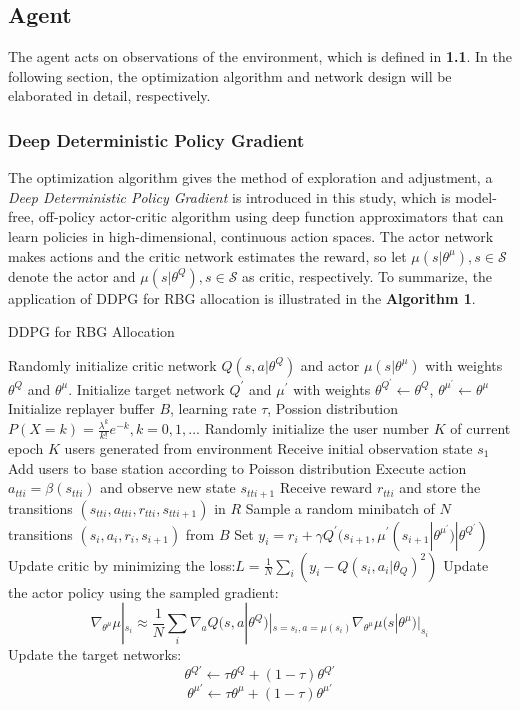 \documentclass{article}
\begin{document}
\subsection{Agent}
The agent acts on observations of the environment, which is defined in \textbf{1.1}.
In the following section, the optimization algorithm and network design will be elaborated in detail, respectively.
\subsubsection{Deep Deterministic Policy Gradient}
The optimization algorithm gives the method of exploration and adjustment, a \textit{Deep Deterministic Policy Gradient} is introduced in this study,
which is model-free, off-policy actor-critic algorithm using deep function approximators that can learn policies in high-dimensional, continuous action spaces.
\cite{Lillicrap2015Continuous}
The actor network makes actions and the critic network estimates the reward,
so let $ \mu (s|\theta^{\mu}), s\in \mathcal{S} $ denote the actor and $ \mu (s|\theta^{Q}), s\in \mathcal{S} $ as critic, respectively.
To summarize, the application of DDPG for RBG allocation is illustrated in the \textbf{Algorithm 1}.

\begin{algorithm}
\caption{DDPG for RBG Allocation}
\begin{algorithmic}

\State Randomly initialize critic network $ Q(s, a|\theta^Q) $ and actor $ \mu (s|\theta^{\mu}) $ with weights $ \theta^Q $ and $ \theta^{\mu} $.
\State Initialize target network $ Q^\prime $ and $ \mu^\prime $ with weights $ \theta^{Q^\prime} \leftarrow \theta^Q $, $ \theta^{\mu^\prime} \leftarrow \theta^{\mu}$ 
\State Initialize replayer buffer $ B $, learning rate $ \tau $, Possion distribution $ P(X=k)=\frac{\lambda^k}{k!}e^{-k},k=0,1,...$
\State Randomly initialize the user number $ K $ of current epoch
\State $ K $ users generated from environment
\State Receive initial observation state $ s_1 $ 
\State Add users to base station according to Poisson distribution
\State Execute action $ a_{tti}=\beta(s_{tti}) $ and observe new state $ s_{tti+1} $
\State Receive reward $ r_{tti} $ and store the transitions $ (s_{tti}, a_{tti}, r_{tti}, s_{tti+1}) $ in $ R $
\State Sample a random minibatch of $ N $ transitions $ (s_i, a_i, r_i, s_{i+1}) $ from $ B $
\State Set $ y_i = r_i + \gamma Q^{\prime}(s_{i+1}, \mu^{\prime}(s_{i+1}|\theta^{\mu^{\prime}})|\theta^{Q^{\prime}}) $
\State Update critic by minimizing the loss:$ L=\frac{1}{N} \sum_{i}(y_i - Q(s_i, a_i|\theta_Q)^2)$
\State Update the actor policy using the sampled gradient:
$$
\nabla_{\theta^{\mu}}\mu|_{s_i}\approx \frac{1}{N}\sum_i \nabla_{a}Q(s, a|\theta^Q)|_{s=s_i,a=\mu(s_i)}\nabla_{\theta^{\mu}}\mu(s|\theta^{\mu})|_{s_i}
$$
\State Update the target networks:
$$
\theta^{Q \prime} \leftarrow \tau\theta^{Q} + (1-\tau)\theta^{Q \prime}
$$
$$
\theta^{\mu \prime} \leftarrow \tau\theta^{\mu} + (1-\tau)\theta^{\mu \prime}
$$
\EndFor
\EndFor
\end{algorithmic}
\end{algorithm}
\end{document}
